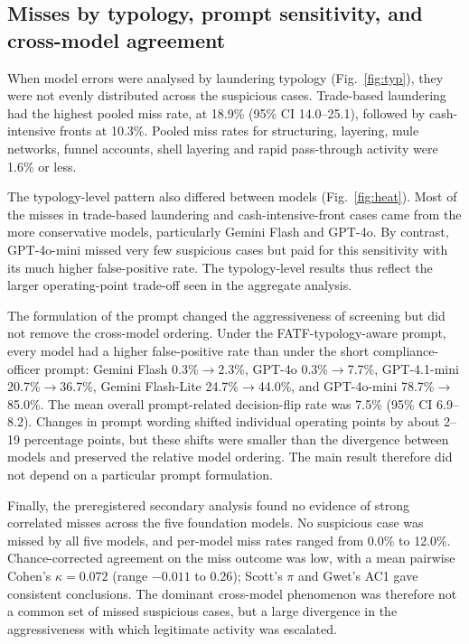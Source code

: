 \documentclass[pdflatex,sn-basic,Numbered]{sn-jnl}
\begin{document}
\subsection{Misses by typology, prompt sensitivity, and cross-model agreement}\label{sec:typology}

When model errors were analysed by laundering typology (Fig.~\ref{fig:typ}), they were not evenly distributed across the suspicious cases. Trade-based laundering had the highest pooled miss rate, at 18.9\% (95\% CI 14.0--25.1), followed by cash-intensive fronts at 10.3\%. Pooled miss rates for structuring, layering, mule networks, funnel accounts, shell layering and rapid pass-through activity were 1.6\% or less.

The typology-level pattern also differed between models (Fig.~\ref{fig:heat}). Most of the misses in trade-based laundering and cash-intensive-front cases came from the more conservative models, particularly Gemini Flash and GPT-4o. By contrast, GPT-4o-mini missed very few suspicious cases but paid for this sensitivity with its much higher false-positive rate. The typology-level results thus reflect the larger operating-point trade-off seen in the aggregate analysis.

The formulation of the prompt changed the aggressiveness of screening but did not remove the cross-model ordering. Under the FATF-typology-aware prompt, every model had a higher false-positive rate than under the short compliance-officer prompt: Gemini Flash 0.3\%$\rightarrow$2.3\%, GPT-4o 0.3\%$\rightarrow$7.7\%, GPT-4.1-mini 20.7\%$\rightarrow$36.7\%, Gemini Flash-Lite 24.7\%$\rightarrow$44.0\%, and GPT-4o-mini 78.7\%$\rightarrow$85.0\%. The mean overall prompt-related decision-flip rate was 7.5\% (95\% CI 6.9--8.2). Changes in prompt wording shifted individual operating points by about 2--19 percentage points, but these shifts were smaller than the divergence between models and preserved the relative model ordering. The main result therefore did not depend on a particular prompt formulation.

Finally, the preregistered secondary analysis found no evidence of strong correlated misses across the five foundation models. No suspicious case was missed by all five models, and per-model miss rates ranged from 0.0\% to 12.0\%. Chance-corrected agreement on the miss outcome was low, with a mean pairwise Cohen's $\kappa = 0.072$ (range $-0.011$ to $0.26$); Scott's $\pi$ and Gwet's AC1 gave consistent conclusions. The dominant cross-model phenomenon was therefore not a common set of missed suspicious cases, but a large divergence in the aggressiveness with which legitimate activity was escalated.
\end{document}

